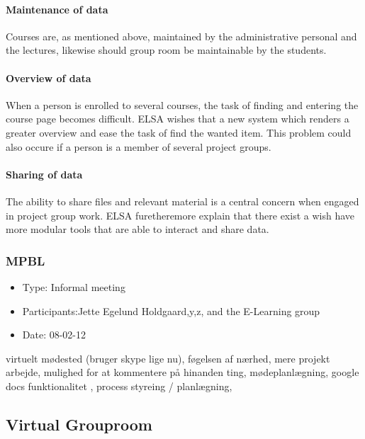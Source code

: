 \paragraph{Maintenance of data} Courses are, as mentioned above, maintained by the administrative personal and the lectures, likewise should group room be maintainable by the students. 
\paragraph{Overview of data} When a person is enrolled to several courses, the task of finding and entering the course page becomes  difficult. ELSA wishes that a new system which renders a greater overview and ease the task of find the wanted item. This problem could also occure if a person is a member of several project groups.
\paragraph{Sharing of data} The ability to share files and relevant material is a central concern when engaged in project group work. ELSA furetheremore explain that there exist a wish have more modular tools that are able to interact and share data. 


\subsubsection{MPBL}
\begin{itemize}
	\item Type: Informal meeting
	\item Participants:Jette Egelund Holdgaard,y,z, and the E-Learning group
	\item Date: 08-02-12
\end{itemize}
virtuelt mødested (bruger skype lige nu), føgelsen af nærhed, mere projekt arbejde, mulighed for at kommentere på hinanden ting, mødeplanlægning, google docs funktionalitet , process styreing / planlægning, 

\subsection{Virtual Grouproom}


